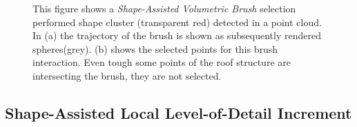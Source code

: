 \begin{figure}
\centering
{}\par\medskip
{}
\caption{This figure shows a \textit{Shape-Assisted Volumetric Brush} selection performed shape cluster (transparent red) detected in a point cloud. In (a) the trajectory of the brush is shown as subsequently rendered spheres(grey). (b) shows the selected points for this brush interaction. Even tough some points of the roof structure are intersecting the brush, they are not selected. }
\label{fig:brush}
\end{figure}


\subsection{Shape-Assisted Local Level-of-Detail Increment}
\label{sec:lod_increment}

